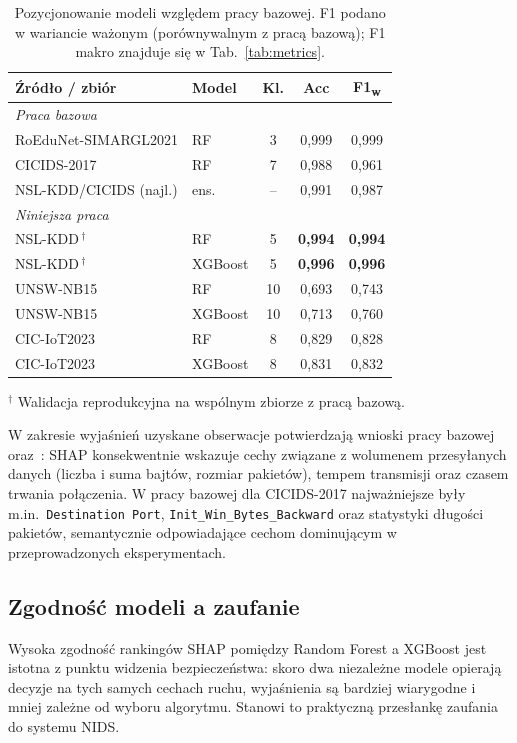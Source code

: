 \documentclass[conference]{IEEEtran}
\begin{document}
\begin{table}[t]
\caption{Pozycjonowanie modeli względem pracy bazowej. F1 podano w wariancie ważonym (porównywalnym z pracą bazową); F1 makro znajduje się w Tab.~\ref{tab:metrics}.}
\label{tab:compare}
\centering
\footnotesize
\begin{tabular}{llccc}
\toprule
Źródło / zbiór & Model & Kl. & Acc & F1\textsubscript{w} \\
\midrule
\multicolumn{5}{l}{\emph{Praca bazowa}~\cite{arreche2024xaiids,arreche2024featureselection}}\\
RoEduNet-SIMARGL2021      & RF       & 3  & 0,999 & 0,999 \\
CICIDS-2017               & RF       & 7  & 0,988 & 0,961 \\
NSL-KDD/CICIDS (najl.)    & ens.     & -- & 0,991 & 0,987 \\
\midrule
\multicolumn{5}{l}{\emph{Niniejsza praca}}\\
NSL-KDD\,$^\dagger$ & RF      & 5  & \textbf{0,994} & \textbf{0,994} \\
NSL-KDD\,$^\dagger$ & XGBoost & 5  & \textbf{0,996} & \textbf{0,996} \\
UNSW-NB15   & RF      & 10 & 0,693 & 0,743 \\
UNSW-NB15   & XGBoost & 10 & 0,713 & 0,760 \\
CIC-IoT2023 & RF      & 8  & 0,829 & 0,828 \\
CIC-IoT2023 & XGBoost & 8  & 0,831 & 0,832 \\
\bottomrule
\end{tabular}

\vspace{2pt}
\footnotesize $^\dagger$ Walidacja reprodukcyjna na wspólnym zbiorze z pracą bazową.

\end{table}

W zakresie wyjaśnień uzyskane obserwacje potwierdzają wnioski pracy bazowej oraz~\cite{arreche2024featureselection}: SHAP konsekwentnie wskazuje cechy związane z wolumenem przesyłanych danych (liczba i suma bajtów, rozmiar pakietów), tempem transmisji oraz czasem trwania połączenia. W pracy bazowej dla CICIDS-2017 najważniejsze były m.in.\ \texttt{Destination Port}, \texttt{Init\_Win\_Bytes\_Backward} oraz statystyki długości pakietów, semantycznie odpowiadające cechom dominującym w przeprowadzonych eksperymentach.

\subsection{Zgodność modeli a zaufanie}
Wysoka zgodność rankingów SHAP pomiędzy Random Forest a XGBoost jest istotna z punktu widzenia bezpieczeństwa: skoro dwa niezależne modele opierają decyzje na tych samych cechach ruchu, wyjaśnienia są bardziej wiarygodne i mniej zależne od wyboru algorytmu. Stanowi to praktyczną przesłankę zaufania do systemu NIDS.
\end{document}
